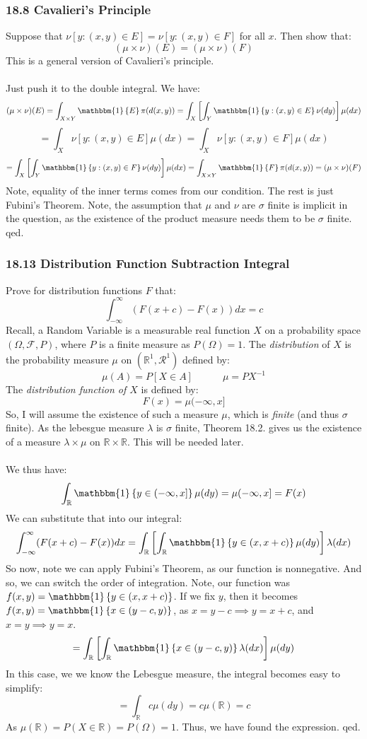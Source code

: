 \documentclass[12pt,a4paper]{article}
\newcommand{\1}[1]{\mathbbm{1}\left\{ #1 \right\}}
\newcommand{\R}{\mathbb{R}}
\newcommand{\fcal}{\mathcal{F}}
\newcommand{\rcal}{\mathcal{R}}
\begin{document}
\subsubsection{18.8 Cavalieri's Principle} Suppose that $\nu[y: (x, y) \in E] = \nu[y: (x,y) \in F]$ for all $x$. Then show that:
$$
	(\mu \times \nu)(E) =
	(\mu \times \nu)(F)
$$
This is a general version of Cavalieri's principle.
\\\\
Just push it to the double integral. We have:
$$
	(\mu \times \nu)(E) =
	\int_{X \times Y} \1{E} \pi(d(x,y)) =
	\int_X \left[\int_Y \1{y : (x,y) \in E} \nu(dy)\right] \mu(dx)
$$
$$
	= 
	\int_X \nu[y: (x, y) \in E] \mu(dx) =
	\int_X \nu[y: (x, y) \in F] \mu(dx)
$$
$$
	= \int_X \left[\int_Y \1{y : (x,y) \in F} \nu(dy)\right] \mu(dx)
	= \int_{X \times Y} \1{F} \pi(d(x,y))
	= (\mu \times \nu)(F)
$$
Note, equality of the inner terms comes from our condition. The rest is just Fubini's Theorem. Note, the assumption that $\mu$ and $\nu$ are $\sigma$ finite is implicit in the question, as the existence of the product measure needs them to be $\sigma$ finite. qed.

\subsubsection{18.13 Distribution Function Subtraction Integral} 
Prove for distribution functions $F$ that:
$$
	\int_{-\infty}^\infty (F(x + c) - F(x)) dx = c
$$
Recall, a Random Variable is a measurable real function $X$ on a probability space $(\Omega, \fcal, P)$, where $P$ is a finite measure as $P(\Omega) = 1$. The \textit{distribution} of $X$ is the probability measure $\mu$ on $(\R^1, \rcal^1)$ defined by:
$$
	\mu(A) = P[X \in A] \quad\quad\quad
	\mu = PX^{-1}
$$
The \textit{distribution function of $X$} is defined by:
$$
	F(x) = \mu(-\infty, x]
$$
So, I will assume the existence of such a measure $\mu$, which is \textit{finite} (and thus $\sigma$ finite). As the lebesgue measure $\lambda$ is $\sigma$ finite, Theorem 18.2. gives us the existence of a measure $\lambda \times \mu$ on $\R \times \R$. This will be needed later.
\\\\
We thus have:
$$
	\int_\R \1{y \in (-\infty,x]} \mu(dy) = \mu(-\infty, x] = F(x)
$$
We can substitute that into our integral:
$$
	\int_{-\infty}^\infty (F(x + c) - F(x)) dx =
	\int_\R \left[\int_\R \1{y \in (x, x+c)} \mu(dy)\right] \lambda(dx)
$$
So now, note we can apply Fubini's Theorem, as our function is nonnegative. And so, we can switch the order of integration. Note, our function was $f(x,y) = \1{y \in (x, x+c)}$. If we fix $y$, then it becomes $f(x,y) = \1{x \in (y - c, y)}$, as $x = y - c \implies y = x + c$, and $x = y \implies y = x$. 
$$
	= \int_\R \left[\int_\R \1{x \in (y - c, y)} \lambda(dx)\right] \mu(dy)
$$
In this case, we we know the Lebesgue measure, the integral becomes easy to simplify:
$$
	= \int_\R c \mu(dy) = c\mu(\R) = c
$$
As $\mu(\R) = P(X \in \R) = P(\Omega) = 1$. Thus, we have found the expression. qed.
\end{document}
